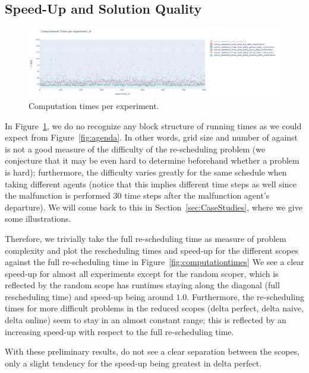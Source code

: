 \documentclass{article}
\begin{document}
\subsection{Speed-Up and Solution Quality}

\begin{figure}[hbtp]
    \includegraphics[width=\textwidth]{Figures/computation_times_per_experiment_id.PNG}
	\caption{Computation times per experiment.}
	\label{fig:computationtimesexperimentid}
\end{figure}
In Figure~\ref{fig:computationtimesexperimentid}, we do no recognize any block structure of running times as we could expect from Figure~\ref{fig:agenda}. In other words, grid size and number of against is not a good measure of the difficulty of the re-scheduling problem (we conjecture that it may be even hard to determine beforehand whether a problem is hard); furthermore, the difficulty varies greatly for the same schedule when taking different agents (notice that this implies different time steps as well since the malfunction is performed 30 time steps after the malfunction agent's departure). We will come back to this in Section~\ref{sec:CaseStudies}, where we give some illustrations.

Therefore, we trivially take the full re-scheduling time as measure of problem complexity and plot the rescheduling times and speed-up for the different scopes against the full re-scheduling time in Figure~\ref{fig:computationtimes}
We see a clear speed-up for almost all experiments except for the random scoper, which is reflected by the random scope has runtimes staying along the diagonal (full rescheduling time) and speed-up being around $1.0$.
Furthermore, the re-scheduling times for more difficult problems in the reduced scopes (delta perfect, delta naive, delta online) seem to stay in an almost constant range; this is reflected by an increasing speed-up with respect to the full re-scheduling time.

With these preliminary results, do not see a clear separation between the scopes, only a slight tendency for the speed-up being greatest in delta perfect.
\end{document}
